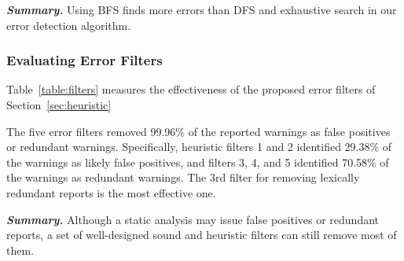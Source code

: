 \vspace{1mm}

\noindent \textbf{\textit{Summary.}} Using BFS finds more errors than DFS and
exhaustive search in our error detection algorithm. 


\subsubsection{Evaluating Error Filters}
\label{sec:filters}

Table~\ref{table:filters} measures the effectiveness of the proposed 
error filters of Section~\ref{sec:heuristic}

The five error filters removed 99.96\% of the reported warnings as false positives
or redundant warnings. Specifically, heuristic filters 1 and 2 identified
29.38\% of the warnings as likely false positives, and filters 3, 4,
and 5 identified 70.58\% of the warnings as redundant warnings.
The 3rd filter for removing lexically redundant
reports is the most effective one.


\vspace{1mm}

\noindent \textbf{\textit{Summary.}} Although a static analysis may
issue false positives or redundant reports, a set of well-designed
sound and heuristic filters can still remove most of them.

